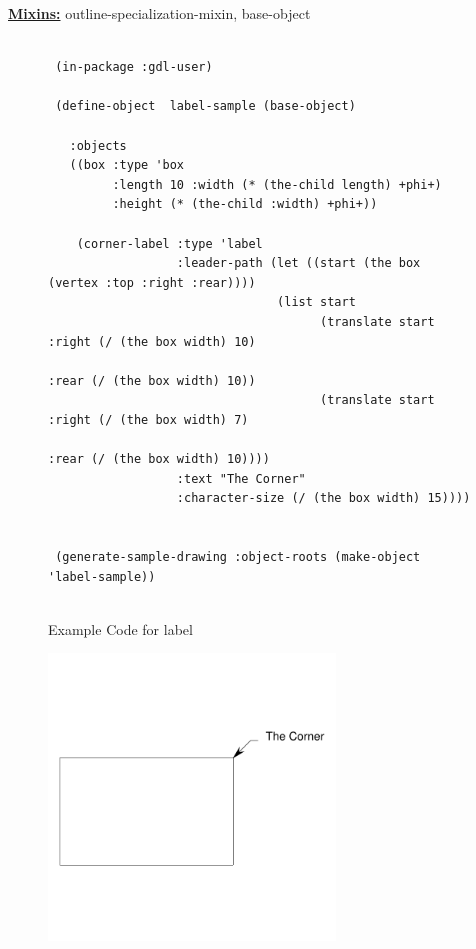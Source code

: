 \documentclass [11pt]{book}
\begin{document}
\begin{itemize}
\textbf{
\underline{Mixins:}} outline-specialization-mixin, base-object




\begin{figure}
\begin{lrbox}{\boxedverb}
\begin{minipage}{\linewidth}
{\small

\begin{verbatim}        

 (in-package :gdl-user)
                   
 (define-object  label-sample (base-object)
  
   :objects
   ((box :type 'box
         :length 10 :width (* (the-child length) +phi+)
         :height (* (the-child :width) +phi+))
   
    (corner-label :type 'label
                  :leader-path (let ((start (the box (vertex :top :right :rear))))
                                (list start
                                      (translate start :right (/ (the box width) 10)
                                                       :rear (/ (the box width) 10))
                                      (translate start :right (/ (the box width) 7)
                                                       :rear (/ (the box width) 10))))
                  :text "The Corner"
                  :character-size (/ (the box width) 15))))


 (generate-sample-drawing :object-roots (make-object 'label-sample))


\end{verbatim}}
\end{minipage}
\end{lrbox}
\fbox{\usebox{\boxedverb}}

\caption{Example Code for label}

\label{fig:example-code-label}

\end{figure}

\begin{figure}
\begin{center}
\includegraphics[width=3in,height=3in]{../images/example-label.pdf}
\end{center}


\end{figure}
\end{itemize}
\end{document}
